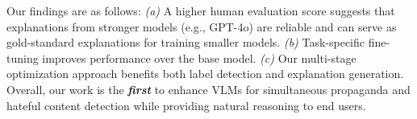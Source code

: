 Our findings are as follows:
\textit{(a)} A higher human evaluation score suggests that explanations from stronger models (e.g., GPT-4o) are reliable and can serve as gold-standard explanations for training smaller models.
\textit{(b)} Task-specific fine-tuning improves performance over the base model.
\textit{(c)} Our multi-stage optimization approach benefits both label detection and explanation generation.
Overall, our work is the \textbf{\textit{first}} to enhance VLMs for simultaneous propaganda and hateful content detection while providing natural reasoning to end users.






